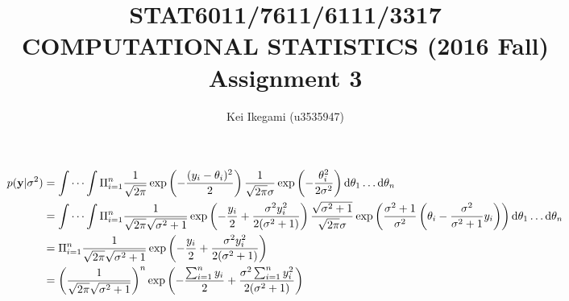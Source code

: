 \documentclass{article}
\begin{document}
\title{STAT6011/7611/6111/3317 \\ 
COMPUTATIONAL STATISTICS (2016 Fall) \\
Assignment 3}
\author{Kei Ikegami (u3535947)}
\maketitle

\section{}
	\subsection{}
		\begin{align*}
			p({\bf y} | \sigma^2) &= \idotsint \Pi_{i = 1}^{n} \frac{1}{\sqrt{2\pi}} \exp\left( -\frac{(y_i - \theta_i)^2}{2}\right)\frac{1}{\sqrt{2\pi}\sigma} \exp\left( -\frac{\theta_i^2}{2\sigma^2}\right)\mathrm{d}\theta_1 \dots \mathrm{d}\theta_n \\
			&= \idotsint \Pi_{i = 1}^{n} \frac{1}{\sqrt{2\pi}\sqrt{\sigma^2 + 1}} \exp\left( -\frac{y_i}{2} + \frac{\sigma^2 y_i^2}{2(\sigma^2 + 1)}\right) \frac{\sqrt{\sigma^2 + 1}}{\sqrt{2\pi}\sigma} \exp\left( \frac{\sigma^2 + 1}{\sigma^2} \left(\theta_i -\frac{\sigma^2}{\sigma^2 + 1}y_i \right)\right)\mathrm{d}\theta_1 \dots \mathrm{d}\theta_n \\
			&= \Pi_{i = 1}^{n} \frac{1}{\sqrt{2\pi}\sqrt{\sigma^2 + 1}} \exp\left( -\frac{y_i}{2} + \frac{\sigma^2 y_i^2}{2(\sigma^2 + 1)}\right) \\
			&= \left(\frac{1}{\sqrt{2\pi}\sqrt{\sigma^2 + 1}}\right)^{n} \exp \left( -\frac{\sum_{i=1}^{n} y_i}{2} + \frac{\sigma^2 \sum_{i=1}^{n} y_i^2}{2(\sigma^2 + 1)}\right)
		\end{align*}
\end{document}
